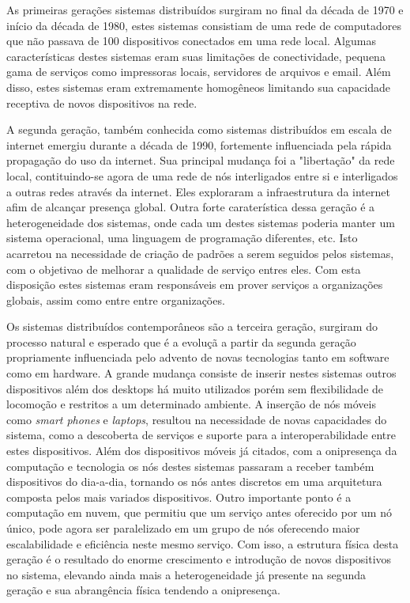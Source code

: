 \documentclass[
    article,            %
    11pt,               %
    oneside,            %
    a4paper,            %
    english,            %
    brazil,             %
    sumario=tradicional,
    ]{abntex2}
\begin{document}
As primeiras gerações sistemas distribuídos surgiram no final da década de 1970 e início da década de 1980, estes sistemas consistiam de uma rede de computadores que não passava de 100 dispositivos conectados em uma rede local. Algumas características destes sistemas eram suas limitações de conectividade, pequena gama de serviços como impressoras locais, servidores de arquivos e email. Além disso, estes sistemas eram extremamente homogêneos limitando sua capacidade receptiva de novos dispositivos na rede.

A segunda geração, também conhecida como sistemas distribuídos em escala de internet emergiu durante a década de 1990, fortemente influenciada pela rápida propagação do uso da internet. Sua principal mudança foi a "libertação" da rede local, contituindo-se agora de uma rede de nós interligados entre si e interligados a outras redes através da internet. Eles exploraram a infraestrutura da internet afim de alcançar presença global. Outra forte caraterística dessa geração é a heterogeneidade dos sistemas, onde cada um destes sistemas poderia manter um sistema operacional, uma linguagem de programação diferentes, etc. Isto acarretou na necessidade de criação de padrões a serem seguidos pelos sistemas, com o objetivao de melhorar a qualidade de serviço entres eles. Com esta disposição estes sistemas eram responsáveis em prover serviços a organizações globais, assim como entre entre organizações.

Os sistemas distribuídos contemporâneos são a terceira geração, surgiram do processo natural e esperado que é a evoluçã a partir da segunda geração propriamente influenciada pelo advento de novas tecnologias tanto em software como em hardware. A grande mudança consiste de inserir nestes sistemas outros dispositivos além dos desktops há muito utilizados porém sem flexibilidade de locomoção e restritos a um determinado ambiente. A inserção de nós móveis como \textit{smart phones} e \textit{laptops}, resultou na necessidade de novas capacidades do sistema, como a descoberta de serviços e suporte para a interoperabilidade entre estes dispositivos. Além dos dispositivos móveis já citados, com a onipresença da computação e tecnologia os nós destes sistemas passaram a receber também dispositivos do dia-a-dia, tornando os nós antes discretos em uma arquitetura composta pelos mais variados dispositivos. Outro importante ponto é a computação em nuvem, que permitiu que um serviço antes oferecido por um nó único, pode agora ser paralelizado em um grupo de nós oferecendo maior escalabilidade e eficiência neste mesmo serviço. Com isso, a estrutura física desta geração é o resultado do enorme crescimento e introdução de novos dispositivos no sistema, elevando ainda mais a heterogeneidade já presente na segunda geração e sua abrangência física tendendo a onipresença.
\end{document}
